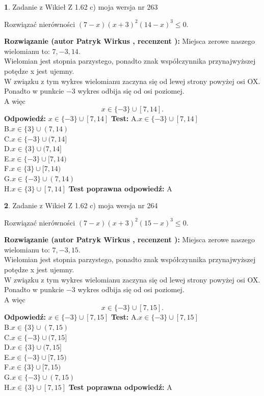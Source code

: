 \documentclass[12pt, a4paper]{article}
\theoremstyle{definition} %
\newtheorem{zad}{}
\newcommand{\zadStart}[1]{\begin{zad}#1\newline}
\newcommand{\zadStop}{\end{zad}}
\newcommand{\rozwStart}[2]{\noindent \textbf{Rozwiązanie (autor #1 , recenzent #2): }\newline}
\newcommand{\rozwStop}{\newline}
\newcommand{\odpStart}{\noindent \textbf{Odpowiedź:}\newline}
\newcommand{\odpStop}{\newline}
\newcommand{\testStart}{\noindent \textbf{Test:}\newline}
\newcommand{\testStop}{\newline}
\newcommand{\kluczStart}{\noindent \textbf{Test poprawna odpowiedź:}\newline}
\newcommand{\kluczStop}{\newline}
\begin{document}
\zadStart{Zadanie z Wikieł Z 1.62 c) moja wersja nr 263}

Rozwiązać nierówności $(7-x)(x+3)^{2}(14-x)^{3}\le0$.
\zadStop
\rozwStart{Patryk Wirkus}{}
Miejsca zerowe naszego wielomianu to: $7, -3, 14$.\\
Wielomian jest stopnia parzystego, ponadto znak współczynnika przy\linebreak najwyższej potędze x jest ujemny.\\ W związku z tym wykres wielomianu zaczyna się od lewej strony powyżej osi OX.\\
Ponadto w punkcie $-3$ wykres odbija się od osi poziomej.\\
A więc $$x \in \{-3\} \cup [7,14].$$
\rozwStop
\odpStart
$x \in \{-3\} \cup [7,14]$
\odpStop
\testStart
A.$x \in \{-3\} \cup [7,14]$\\
B.$x \in \{3\} \cup (7,14)$\\
C.$x \in \{-3\} \cup (7,14]$\\
D.$x \in \{3\} \cup (7,14]$\\
E.$x \in \{-3\} \cup [7,14)$\\
F.$x \in \{3\} \cup [7,14)$\\
G.$x \in \{-3\} \cup (7,14)$\\
H.$x \in \{3\} \cup [7,14]$
\testStop
\kluczStart
A
\kluczStop



\zadStart{Zadanie z Wikieł Z 1.62 c) moja wersja nr 264}

Rozwiązać nierówności $(7-x)(x+3)^{2}(15-x)^{3}\le0$.
\zadStop
\rozwStart{Patryk Wirkus}{}
Miejsca zerowe naszego wielomianu to: $7, -3, 15$.\\
Wielomian jest stopnia parzystego, ponadto znak współczynnika przy\linebreak najwyższej potędze x jest ujemny.\\ W związku z tym wykres wielomianu zaczyna się od lewej strony powyżej osi OX.\\
Ponadto w punkcie $-3$ wykres odbija się od osi poziomej.\\
A więc $$x \in \{-3\} \cup [7,15].$$
\rozwStop
\odpStart
$x \in \{-3\} \cup [7,15]$
\odpStop
\testStart
A.$x \in \{-3\} \cup [7,15]$\\
B.$x \in \{3\} \cup (7,15)$\\
C.$x \in \{-3\} \cup (7,15]$\\
D.$x \in \{3\} \cup (7,15]$\\
E.$x \in \{-3\} \cup [7,15)$\\
F.$x \in \{3\} \cup [7,15)$\\
G.$x \in \{-3\} \cup (7,15)$\\
H.$x \in \{3\} \cup [7,15]$
\testStop
\kluczStart
A
\kluczStop
\end{document}
